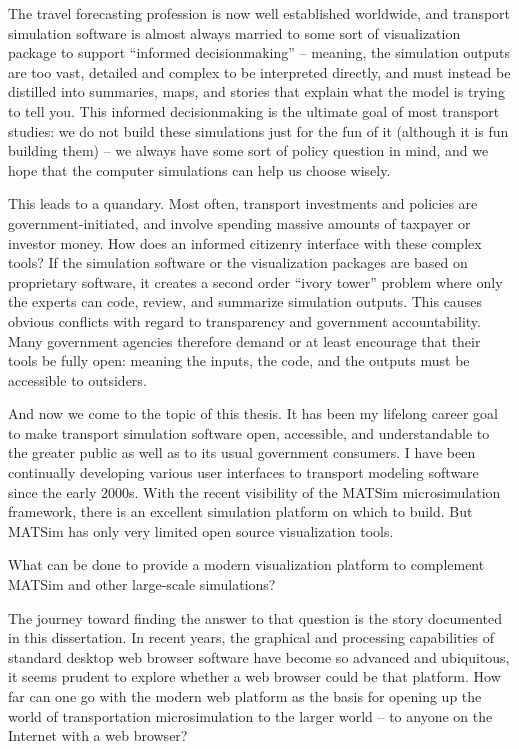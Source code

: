 The travel forecasting profession is now well established worldwide, and transport simulation software is almost always married to some sort of visualization package to support ``informed decisionmaking'' -- meaning, the simulation outputs are too vast, detailed and complex to be interpreted directly, and must instead be distilled into summaries, maps, and stories that explain what the model is trying to tell you. This informed decisionmaking is the ultimate goal of most transport studies: we do not build these simulations just for the fun of it (although it is fun building them) -- we always have some sort of policy question in mind, and we hope that the computer simulations can help us choose wisely.

This leads to a quandary. Most often, transport investments and policies are government-initiated, and involve spending massive amounts of taxpayer or investor money. How does an informed citizenry interface with these complex tools? If the simulation software or the visualization packages are based on proprietary software, it creates a second order ``ivory tower'' problem where only the experts can code, review, and summarize simulation outputs. This causes obvious conflicts with regard to transparency and government accountability. Many government agencies therefore demand or at least encourage that their tools be fully open: meaning the inputs, the code, and the outputs must be accessible to outsiders.

And now we come to the topic of this thesis. It has been my lifelong career goal to make transport simulation software open, accessible, and understandable to the greater public as well as to its usual government consumers. I have been continually developing various user interfaces to transport modeling software since the early 2000s. With the recent visibility of the \gls{MATSim} microsimulation framework, there is an excellent simulation platform on which to build. But MATSim has only very limited open source visualization tools.

What can be done to provide a modern visualization platform to complement MATSim and other large-scale simulations?

The journey toward finding the answer to that question is the story documented in this dissertation. In recent years, the graphical and processing capabilities of standard desktop web browser software have become so advanced and ubiquitous, it seems prudent to explore whether a web browser could be that platform. How far can one go with the modern web platform as the basis for opening up the world of transportation microsimulation to the larger world -- to anyone on the Internet with a web browser?

